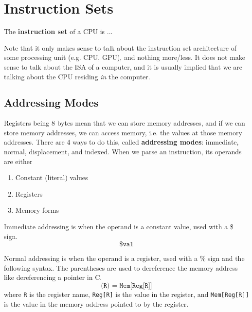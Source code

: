 \section{Instruction Sets} 

  \begin{definition}
    The \textbf{instruction set} of a CPU is ...
  \end{definition}

  Note that it only makes sense to talk about the instruction set architecture of some processing unit (e.g. CPU, GPU), and nothing more/less. It does not make sense to talk about the ISA of a computer, and it is usually implied that we are talking about the CPU residing \textit{in} the computer. 

\subsection{Addressing Modes}

  Registers being 8 bytes mean that we can store memory addresses, and if we can store memory addresses, we can access memory, i.e. the values at those memory addresses. There are 4 ways to do this, called \textbf{addressing modes}: immediate, normal, displacement, and indexed. When we parse an instruction, its operands are either 
  \begin{enumerate}
    \item Constant (literal) values 
    \item Registers 
    \item Memory forms
  \end{enumerate}

  \begin{definition}
    Immediate addressing is when the operand is a constant value, used with a \$ sign. 
    \begin{equation}
      \texttt{\$val}
    \end{equation}
  \end{definition}

  \begin{definition}
    Normal addressing is when the operand is a register, used with a \% sign and the following syntax. The parentheses are used to dereference the memory address like dereferencing a pointer in C. 
    \begin{equation}
      \texttt{(R) = Mem[Reg[R]]}
    \end{equation}
    where \texttt{R} is the register name, \texttt{Reg[R]} is the value in the register, and \texttt{Mem[Reg[R]]} is the value in the memory address pointed to by the register. 
  \end{definition}

